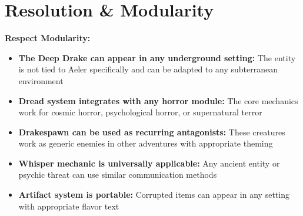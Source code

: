 \documentclass[11pt]{article}
\begin{document}
\section{Resolution \& Modularity}

\textbf{Respect Modularity:} \begin{itemize} \item \textbf{The Deep Drake can appear in any underground setting:} The entity is not tied to Aeler specifically and can be adapted to any subterranean environment \item \textbf{Dread system integrates with any horror module:} The core mechanics work for cosmic horror, psychological horror, or supernatural terror \item \textbf{Drakespawn can be used as recurring antagonists:} These creatures work as generic enemies in other adventures with appropriate theming \item \textbf{Whisper mechanic is universally applicable:} Any ancient entity or psychic threat can use similar communication methods \item \textbf{Artifact system is portable:} Corrupted items can appear in any setting with appropriate flavor text \end{itemize}
\end{document}
